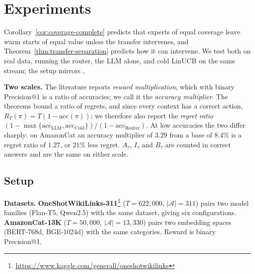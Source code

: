\documentclass{article}
\theoremstyle{definition}
\theoremstyle{remark}
\theoremstyle{remark}
\begin{document}
\section{Experiments}
\label{sec:experiments}

Corollary~\ref{cor:coverage-complete} predicts that experts of equal coverage
leave warm starts of equal value unless the transfer intervenes, and
Theorem~\ref{thm:transfer-separation} predicts how it can intervene. We test
both on real data, running the router, the LLM alone, and cold LinUCB on the
same stream; the setup mirrors \cite{chen2024llmdecision}.

\textbf{Two scales.} The literature reports \emph{reward multiplication},
which with binary Precision@1 is a ratio of accuracies; we call it the
\emph{accuracy multiplier}. The theorems bound a ratio of regrets, and since
every context has a correct action, $R_T(\pi)=T(1-\mathrm{acc}(\pi))$; we
therefore also report the \emph{regret ratio}
$(1-\max\{\mathrm{acc}_{\mathrm{LLM}},\mathrm{acc}_{\mathrm{Cold}}\})/(1-\mathrm{acc}_{\mathrm{Router}})$.
At low accuracies the two differ sharply: on AmazonCat an accuracy multiplier
of $3.29$ from a base of $8.4\%$ is a regret ratio of $1.27$, or $21\%$ less
regret. $A_\tau$, $I_\tau$ and $B_\tau$ are counted in correct answers and are
the same on either scale.

\subsection{Setup}
\label{sec:exp-setup}

\textbf{Datasets.} \textbf{OneShotWikiLinks-311}\footnote{\url{https://www.kaggle.com/generall/oneshotwikilinks}} ($T\!=\!622{,}000$,
$|\mathcal A|\!=\!311$) pairs two model families (Flan-T5, Qwen2.5) with the
same dataset, giving six configurations. \textbf{AmazonCat-13K}
\cite{bhatia2016extreme} ($T\!=\!50{,}000$, $|\mathcal A|\!=\!13{,}330$) pairs two embedding spaces
(BERT-768d, BGE-1024d) with the same categories. Reward is binary
Precision@1.
\end{document}
